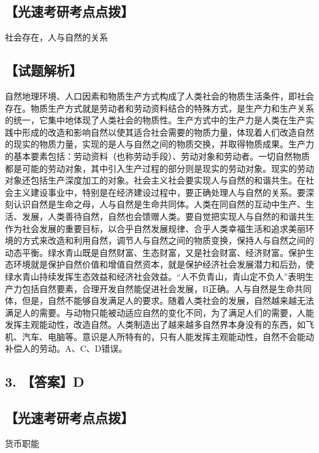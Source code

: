 \documentclass[UTF8,11pt]{ctexart}
\begin{document}
\subsection*{【光速考研考点点拨】}

社会存在，人与自然的关系


\subsection*{【试题解析】}

自然地理环境、人口因素和物质生产方式构成了人类社会的物质生活条件，即社会存在。物质生产方式就是劳动者和劳动资料结合的特殊方式，是生产力和生产关系的统一，它集中地体现了人类社会的物质性。生产方式中的生产力是人类在生产实践中形成的改造和影响自然以使其适合社会需要的物质力量，体现着人们改造自然的现实的物质力量，实现的是人与自然之间的物质交换，并取得物质成果。生产力的基本要素包括：劳动资料（也称劳动手段）、劳动对象和劳动者。一切自然物质都是可能的劳动对象，其中引入生产过程的部分则是现实的劳动对象。现实的劳动对象还包括生产深度加工的对象。社会主义社会要实现人与自然的和谐共生。在社会主义建设事业中，特别是在经济建设过程中，要正确处理人与自然的关系。要深刻认识自然是生命之母，人与自然是生命共同体。人类在同自然的互动中生产、生活、发展，人类善待自然，自然也会馈赠人类。要自觉把实现人与自然的和谐共生作为社会发展的重要目标，以合乎自然发展规律、合乎人类幸福生活和追求美丽环境的方式来改造和利用自然，调节人与自然之间的物质变换，保持人与自然之间的动态平衡。绿水青山既是自然财富、生态财富，又是社会财富、经济财富。保护生态环境就是保护自然价值和增值自然资本，就是保护经济社会发展潜力和后劲，使绿水青山持续发挥生态效益和经济社会效益。“人不负青山，青山定不负人”表明生产力包括自然要素，合理开发自然能促进社会发展，B正确。人与自然是生命共同体，但是，自然不能够自发满足人的要求。随着人类社会的发展，自然越来越无法满足人的需要。与动物只能被动适应自然的变化不同，为了满足人们的需要，人能发挥主观能动性，改造自然。人类制造出了越来越多自然界本身没有的东西，如飞机、汽车、电脑等。意识是人所特有的，只有人能发挥主观能动性，自然不会能动补偿人的劳动。A、C、D错误。


\subsection*{3. 【答案】D}

\subsection*{【光速考研考点点拨】}

货币职能
\end{document}
